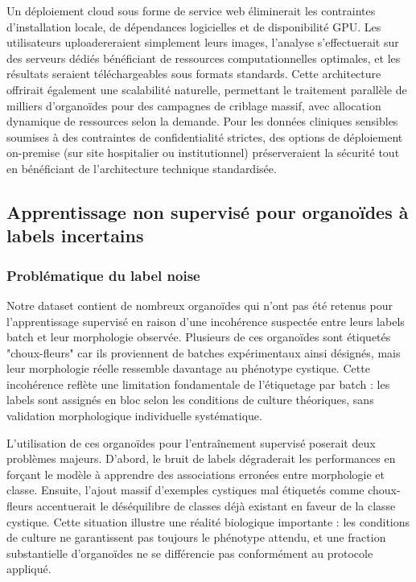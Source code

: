 Un déploiement cloud sous forme de service web éliminerait les contraintes d'installation locale, de dépendances logicielles et de disponibilité GPU. Les utilisateurs uploadereraient simplement leurs images, l'analyse s'effectuerait sur des serveurs dédiés bénéficiant de ressources computationnelles optimales, et les résultats seraient téléchargeables sous formats standards. Cette architecture offrirait également une scalabilité naturelle, permettant le traitement parallèle de milliers d'organoïdes pour des campagnes de criblage massif, avec allocation dynamique de ressources selon la demande. Pour les données cliniques sensibles soumises à des contraintes de confidentialité strictes, des options de déploiement on-premise (sur site hospitalier ou institutionnel) préserveraient la sécurité tout en bénéficiant de l'architecture technique standardisée.

\subsection{Apprentissage non supervisé pour organoïdes à labels incertains}

\subsubsection{Problématique du label noise}

Notre dataset contient de nombreux organoïdes qui n'ont pas été retenus pour l'apprentissage supervisé en raison d'une incohérence suspectée entre leurs labels batch et leur morphologie observée. Plusieurs de ces organoïdes sont étiquetés "choux-fleurs" car ils proviennent de batches expérimentaux ainsi désignés, mais leur morphologie réelle ressemble davantage au phénotype cystique. Cette incohérence reflète une limitation fondamentale de l'étiquetage par batch : les labels sont assignés en bloc selon les conditions de culture théoriques, sans validation morphologique individuelle systématique.

L'utilisation de ces organoïdes pour l'entraînement supervisé poserait deux problèmes majeurs. D'abord, le bruit de labels dégraderait les performances en forçant le modèle à apprendre des associations erronées entre morphologie et classe. Ensuite, l'ajout massif d'exemples cystiques mal étiquetés comme choux-fleurs accentuerait le déséquilibre de classes déjà existant en faveur de la classe cystique. Cette situation illustre une réalité biologique importante : les conditions de culture ne garantissent pas toujours le phénotype attendu, et une fraction substantielle d'organoïdes ne se différencie pas conformément au protocole appliqué.

